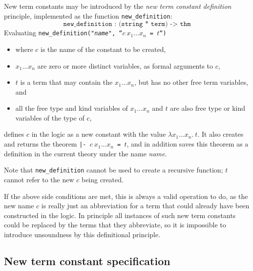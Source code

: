 New term constants may be introduced by the {\it new term constant definition\/}
principle, implemented as the \ML{} function \texttt{new\_definition}:
\[\texttt{new\_definition~:~(string * term)~->~thm}\]
%
Evaluating
\texttt{new\_definition("\mbox{\it name}",~``$c\ x_1 \ldots x_n$\ =\ $t$``)}
\begin{itemize}
\item where $c$ is the name of the constant to be created,
\item $x_1 \ldots x_n$ are zero or more distinct variables,
as formal arguments to $c$,
\item $t$ is a term that may contain the $x_1 \ldots x_n$, but has no other
free term variables, and
\item all the free type and kind variables of $x_1 \ldots x_n$ and $t$ are also
free type or kind variables of the type of $c$,
\end{itemize}
defines $c$ in the logic as a new constant with the value
$\lambda x_1 \ldots x_n.\ t$.
It also creates and returns the theorem
\verb+|- +\texttt{$c\ x_1 \ldots x_n$\ =\ $t$}, and in addition saves this
theorem as a definition in the current theory under the name {\it name}.

Note that \texttt{new\_definition} cannot be used to create a recursive
function; $t$ cannot refer to the new $c$ being created.

If the above side conditions are met,
this is always a valid operation to do, as the new name $c$ is really just
an abbreviation for a term that could already have been constructed in the 
logic.  In principle all instances of such new term constants could be
replaced by the terms that they abbreviate, so it is impossible to introduce
unsoundness by this definitional principle.

\subsection{New term constant specification}

